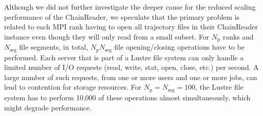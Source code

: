 Although we did not further investigate the deeper cause for the reduced scaling performance of the ChainReader, we speculate that the primary problem is related to each MPI rank having to open all trajectory files in their ChainReader instance even though they will only read from a small subset.
For $N_{\text{p}}$ ranks and $N_{\text{seg}}$ file segments, in total, $N_{p } N_{\text{seg}}$ file opening/closing operations have to be performed. 
Each server that is part of a Lustre file system can only handle a limited number of I/O requests (read, write, stat, open, close, etc.) per second.
A large number of such requests, from one or more users and one or more jobs, can lead to contention for storage resources. 
For $N_{\text{p}} = N_{\text{seg}} = 100$, the Lustre file system has to perform 10,000 of these operations almost simultaneously, which might degrade performance. 


